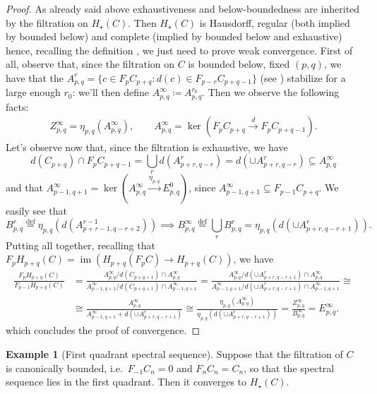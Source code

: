 \documentclass[a4paper]{article}
\newcommand{\Hs}{ H_{\star} }
\DeclareMathOperator{\Ima}{im}			%
\theoremstyle{plain}
\theoremstyle{definition}
\newtheorem{example}[thm]{Example}
\begin{document}
		\begin{proof}
			As already said above exhaustiveness and below-boundedness are inherited by the filtration on $\Hs(C)$. Then $\Hs(C)$ is Hausdorff, regular (both implied by bounded below) and complete (implied by bounded below and exhaustive) hence, recalling the definition , we just need to prove weak convergence. First of all, observe that, since the filtration on $C$ is bounded below, fixed $(p,q)$, we have that the $A^r_{p,q} = \{c \in F_pC_{p+q} : d(c) \in F_{p-r}C_{p+q-1}\}$ (see ) stabilize for a large enough $r_0$: we'll then define $A^{\infty}_{p,q} \coloneqq A^{r_0}_{p,q}$. Then we observe the following facts:
			\begin{gather*}
				Z^{\infty}_{p,q} = \eta_{p,q}(A^{\infty}_{p,q}), \qquad A^{\infty}_{p,q} = \ker(F_pC_{p+q} \stackrel{d}{\longrightarrow} F_pC_{p+q-1}).
			\end{gather*}
			Let's observe now that, since the filtration is exhaustive, we have
			\[
				d(C_{p+q}) \cap F_pC_{p+q-1} = \bigcup_r d(A^r_{p+r, q-r}) = d(\cup A^r_{p+r, q-r}) \subseteq A^{\infty}_{p,q}
			\]
			and that $A^{\infty}_{p-1,q+1} = \ker(A^{\infty}_{p,q} \xrightarrow{\eta_{p,q}} E^0_{p,q})$, since $A^{\infty}_{p-1,q+1} \subseteq F_{p-1}C_{p+q}$. We easily see that
			\[
				B^r_{p,q} \stackrel{\textrm{def}}{=} \eta_{p,q}(d(A^{r-1}_{p+r-1, q-r+2})) \implies B^{\infty}_{p,q} \stackrel{\textrm{def}}{=} \bigcup_r B^r_{p,q} = \eta_{p,q}(d(\cup A^r_{p+r, q-r+1})).
			\]
			Putting all together, recalling that $F_pH_{p+q}(C) = \Ima(H_{p+q}(F_pC) \to H_{p+q}(C))$, we have
			\begin{align*}
				\frac{F_pH_{p+q}(C)}{F_{p-1}H_{p+q}(C)} &= \frac{A^{\infty}_{p,q}/d(C_{p+q+1}) \cap A^{\infty}_{p,q}}{A^{\infty}_{p-1,q+1}/d(C_{p+q+1}) \cap A^{\infty}_{p-1,q+1}} = \frac{A^{\infty}_{p,q}/d(\cup A^r_{p+r, q-r+1}) \cap A^{\infty}_{p,q}}{A^{\infty}_{p-1,q+1}/d(\cup A^r_{p+r, q-r+1}) \cap A^{\infty}_{p-1,q+1}} \cong \\
				&\cong \frac{A^{\infty}_{p,q}}{A^{\infty}_{p-1,q+1} + d(\cup A^r_{p+r, q-r+1})} \cong \frac{\eta_{p,q}(A^{\infty}_{p,q})}{\eta_{p,q}(d(\cup A^r_{p+r, q-r+1}))} = \frac{Z^{\infty}_{p,q}}{B^{\infty}_{p,q}} = E^{\infty}_{p,q}.
			\end{align*}
			which concludes the proof of convergence.
		\end{proof}
		\begin{example}[First quadrant spectral sequence]
			\label{example:first-quadrant-convergence}
			Suppose that the filtration of $C$ is canonically bounded, i.e.\ $F_{-1}C_n = 0$ and $F_nC_n = C_n$, so that the spectral sequence lies in the first quadrant. Then it converges to $\Hs(C)$.
		\end{example}
\end{document}
